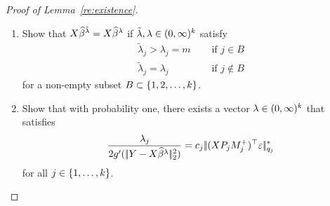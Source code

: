 \documentclass[bj]{imsart}
\newcommand{\normtwo}[1]{\ensuremath{\!|\!| #1 | \! |_{2}}}
\newcommand{\normqj}[1]{\ensuremath{\!|\!| #1 | \! |_{q_j}}}
\newcommand{\normqjd}[1]{\ensuremath{\!|\!| #1 | \! |_{q_j}^*}}
\newcommand{\1}{{\rm 1}\mskip -4,5mu{\rm l} }
\newcommand{\argmin}{\mathop{\mathrm{arg\,min}}}
\def\R{\mathbb{R}}
\begin{document}
\begin{proof}[Proof of Lemma~\ref{re:existence}]
\begin{enumerate}
\item Show that $\textcolor{black}{X}\widehat \beta^{\tilde{\lambda}}=\textcolor{black}{X}\widehat \beta^{\lambda}$ if  $\tilde\lambda,  \lambda \in(0,\infty)^{k}$  satisfy
\begin{align*}
\tilde\lambda_j
> \lambda_j =m &\text{~~~ if } j\in B \\ 
\tilde\lambda_j=\lambda_j & \text{~~~ if }  j\notin B
\end{align*}
for a non-empty subset $B \subset \{1,2,\dots,k\}$.
\item  Show that with probability one, there exists a vector $\lambda\in(0,\infty)^{k}$ that satisfies
 \begin{equation}\label{re:oracleexistence}
  \frac{\lambda_j}{2g'(\,\normtwo{\outcome-\design\estimatort}^2)}=\tuningrelax_j \,\normqjd{(\design \projectionmatrix_j \fusedmatrix_j^{+})^\top\noise}
 \end{equation}
 for all $j\in\{1,\dots,k\}$.
\end{enumerate}



\end{proof}
\end{document}

